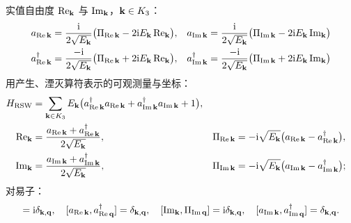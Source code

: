 \begin{keybox}[量子化后的黎曼标量场]
实值自由度 $\operatorname{Re}_{\mathbf{k}}$ 与 $\operatorname{Im}_{\mathbf{k}}$，$\mathbf{k}\in K_{3}$：
\begin{align*}
a_{\operatorname{Re}\mathbf{k}}&=\frac{\mathrm{i}}{2\sqrt{E_{\mathbf{k}}}}
\bigl(\Pi_{\operatorname{Re}\mathbf{k}}-2\mathrm{i} E_{\mathbf{k}}\operatorname{Re}_{\mathbf{k}}\bigr),&
a_{\operatorname{Im}\mathbf{k}}&=\frac{\mathrm{i}}{2\sqrt{E_{\mathbf{k}}}}
\bigl(\Pi_{\operatorname{Im}\mathbf{k}}-2\mathrm{i} E_{\mathbf{k}}\operatorname{Im}_{\mathbf{k}}\bigr)\\
a^{\dagger}_{\operatorname{Re}\mathbf{k}}&=\frac{-\mathrm{i}}{2\sqrt{E_{\mathbf{k}}}}
\bigl(\Pi_{\operatorname{Re}\mathbf{k}}+2\mathrm{i} E_{\mathbf{k}}\operatorname{Re}_{\mathbf{k}}\bigr),&
a^{\dagger}_{\operatorname{Im}\mathbf{k}}&=\frac{-\mathrm{i}}{2\sqrt{E_{\mathbf{k}}}}
\bigl(\Pi_{\operatorname{Im}\mathbf{k}}+2\mathrm{i} E_{\mathbf{k}}\operatorname{Im}_{\mathbf{k}}\bigr)
\end{align*}
用产生、湮灭算符表示的可观测量与坐标：
\begin{align*}
H_{\text{RSW}}&=\sum_{\mathbf{k}\in K_{3}}E_{\mathbf{k}}
\bigl(a^{\dagger}_{\operatorname{Re}\mathbf{k}}a_{\operatorname{Re}\mathbf{k}}
+a^{\dagger}_{\operatorname{Im}\mathbf{k}}a_{\operatorname{Im}\mathbf{k}}+1\bigr),\\
\operatorname{Re}_{\mathbf{k}}&=\frac{a_{\operatorname{Re}\mathbf{k}}+a^{\dagger}_{\operatorname{Re}\mathbf{k}}}{2\sqrt{E_{\mathbf{k}}}},&
\Pi_{\operatorname{Re}\mathbf{k}}&=-\mathrm{i}\sqrt{E_{\mathbf{k}}}\bigl(a_{\operatorname{Re}\mathbf{k}}-a^{\dagger}_{\operatorname{Re}\mathbf{k}}\bigr),\\
\operatorname{Im}_{\mathbf{k}}&=\frac{a_{\operatorname{Im}\mathbf{k}}+a^{\dagger}_{\operatorname{Im}\mathbf{k}}}{2\sqrt{E_{\mathbf{k}}}},&
\Pi_{\operatorname{Im}\mathbf{k}}&=-\mathrm{i}\sqrt{E_{\mathbf{k}}}\bigl(a_{\operatorname{Im}\mathbf{k}}-a^{\dagger}_{\operatorname{Im}\mathbf{k}}\bigr);
\end{align*}
对易子：
\begin{equation*}
[\operatorname{Re}_{\bk},\Pi_{\operatorname{Re}\bq}]=\ii\delta_{\bk,\bq},\quad
[a_{\operatorname{Re}\bk},a^{\dagger}_{\operatorname{Re}\bq}]=\delta_{\bk,\bq},\quad
[\operatorname{Im}_{\bk},\Pi_{\operatorname{Im}\bq}]=\ii\delta_{\bk,\bq},\quad
[a_{\operatorname{Im}\bk},a^{\dagger}_{\operatorname{Im}\bq}]=\delta_{\bk,\bq}.
\end{equation*}
\end{keybox}

